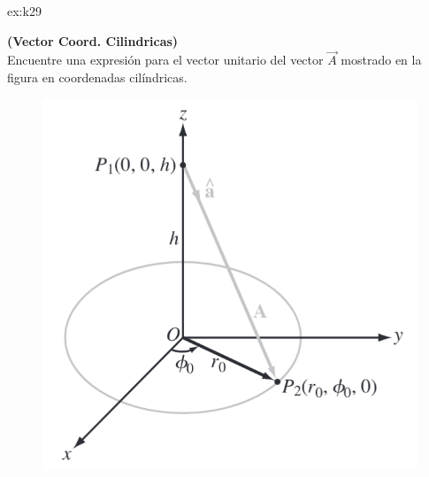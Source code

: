  \begin{multicols}{2}

    \begin{excercise}[][][]{ex:k29}{ \textbf{(Vector Coord. Cilindricas)}\\
            Encuentre una expresión para el vector unitario del vector $\vec{A}$ mostrado en la figura en coordenadas cilíndricas.
            \begin{figure}[H]
                \centering
                \includegraphics[width=0.7\linewidth]{img/01_electric-field/1.png}
            \end{figure}
         }
    \end{excercise}


\end{multicols}

